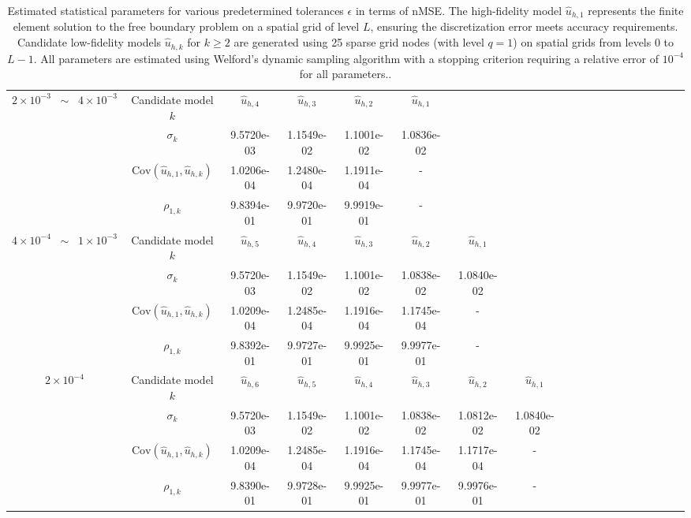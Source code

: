 \begin{table}[ht]
{\begin{tabular}{|c|c|c|c|c|c|c|c|c|c|c|c|c|c|c|c|c|c|c|}
\hline
\hline
\multirow{4}{*}{$2\times 10^{-3}\;\;\sim \;\;4\times 10^{-3}$} &\multicolumn{1}{|c|}{Candidate model $k$} &$\widehat u_{h,4}$&$\widehat u_{h,3}$&$\widehat u_{h,2}$&$\widehat u_{h,1}$&\multirow{4}{*}{}&\multirow{4}{*}{}\\
\cline{2-6}	
&\multicolumn{1}{|c|}{$\sigma_{k}$}&9.5720e-03   &1.1549e-02   &1.1001e-02   &1.0836e-02 &&\\
\cline{2-6}	
&\multicolumn{1}{|c|}{$\text{Cov}\left(\widehat u_{h,1},\widehat u_{h,k}\right)$} &1.0206e-04 &1.2480e-04 &1.1911e-04 &- &&\\
\cline{2-6}	
&\multicolumn{1}{|c|}{$\rho_{1,k}$}&9.8394e-01&9.9720e-01 &9.9919e-01&-&&\\
\hline
\hline
\multirow{4}{*}{$4\times 10^{-4}\;\;\sim \;\;1\times 10^{-3}$} &\multicolumn{1}{|c|}{Candidate model $k$} &$\widehat u_{h,5}$&$\widehat u_{h,4}$&$\widehat u_{h,3}$&$\widehat u_{h,2}$&$\widehat u_{h,1}$&\multirow{4}{*}{}\\
 \cline{2-7}	
&\multicolumn{1}{|c|}{$\sigma_{k}$}&9.5720e-03   &1.1549e-02   &1.1001e-02   &1.0838e-02   &1.0840e-02  &\\
\cline{2-7}	
&\multicolumn{1}{|c|}{$\text{Cov}\left(\widehat u_{h,1},\widehat u_{h,k}\right)$}&1.0209e-04 &1.2485e-04 &1.1916e-04 &1.1745e-04 &- &\\
\cline{2-7}	
&\multicolumn{1}{|c|}{$\rho_{1,k}$}&9.8392e-01 &9.9727e-01 &9.9925e-01 &9.9977e-01 &- &\\
\hline
\hline
\multirow{4}{*}{$2\times 10^{-4}$} &\multicolumn{1}{|c|}{Candidate model $k$} &$\widehat u_{h,6}$&$\widehat u_{h,5}$&$\widehat u_{h,4}$&$\widehat u_{h,3}$&$\widehat u_{h,2}$&$\widehat u_{h,1}$\\
\cline{2-8}
&\multicolumn{1}{|c|}{$\sigma_{k}$}&9.5720e-03   &1.1549e-02   &1.1001e-02   &1.0838e-02   &1.0812e-02  &1.0840e-02\\
\cline{2-8}	
&\multicolumn{1}{|c|}{$\text{Cov}\left(\widehat u_{h,1},\widehat u_{h,k}\right)$}&1.0209e-04&1.2485e-04&1.1916e-04&1.1745e-04&1.1717e-04&-\\
\cline{2-8}	
&\multicolumn{1}{|c|}{$\rho_{1,k}$}&9.8390e-01   &9.9728e-01   &9.9925e-01   &9.9977e-01   &9.9976e-01   &-\\
\hline
\end{tabular}}
\caption{Estimated statistical parameters for various predetermined tolerances $\epsilon$ in terms of nMSE. The high-fidelity model $\widehat u_{h,1}$ represents the finite element solution to the free boundary problem on a spatial grid of level $L$, ensuring the discretization error meets accuracy requirements. Candidate low-fidelity models $\widehat u_{h,k}$ for $k \geq 2$ are generated using 25 sparse grid nodes (with level $q=1$) on spatial grids from levels 0 to $L-1$. All parameters are estimated using Welford's dynamic sampling algorithm with a stopping criterion requiring a relative error of $10^{-4}$ for all parameters..}
\label{Tab:MFMC_parameters}
\end{table}
%

